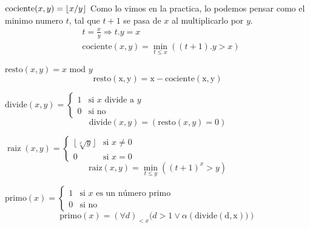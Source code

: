 \documentclass{report}
\begin{document}

\sol $\text{cociente}(x,y)=\lfloor x/y\rfloor\\$
Como lo vimos en la practica, lo podemos pensar como el minimo numero $t$, tal que $t+1$ se pasa
de $x$ al multiplicarlo por $y$.
$$\begin{aligned}&t=\frac{x}{y}\Rightarrow t.y=x\\&\mathrm{cociente}(x,y)=\min_{t\leq x}((t+1).y>x)\end{aligned}$$


\sol $\text{resto}(x,y) =x \text{ mod } y$
$$\mathrm{resto(x,y)=x-cociente(x,y)}$$


\sol $\text{divide}(x,y)=\left\{\begin{array}{ll}1&\text{si }x\text{ divide a }y\\0&\text{si no}\end{array}\right.$
$$\text{divide}(x,y)=( \text{resto} (x,y) = 0)$$


\sol \(\operatorname{raiz}(x,y)=\begin{cases}\lfloor\sqrt[x]{y}\rfloor&\text{si }x\neq0\\0&\text{si }x=0\end{cases}\) 
$$\text{raiz}(x,y)=\min_{t\leq y}((t+1)^x>y)$$

\sol $\mathrm{primo}(x)=\left\{\begin{array}{ll}{1}&{\textrm{si }x\textrm{ es un número primo}}\\{0}&{\textrm{si no}}\end{array}\right.$
\[\text{primo}(x)=(\forall d)_{<x}(d>1\vee\alpha(\mathrm{divide(d,x))})\]
\end{document}
